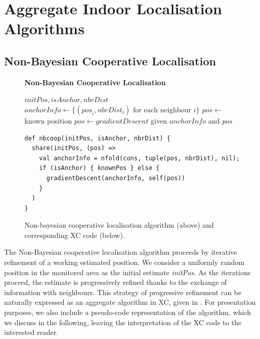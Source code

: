\documentclass[runningheads]{llncs}
\begin{document}
\section{Aggregate Indoor Localisation Algorithms} \label{sec:algorithms}

\subsection{Non-Bayesian Cooperative Localisation}

\begin{figure}[t]
\textbf{Non-Bayesian Cooperative Localisation}
\begin{algorithmic}[1]
    \Require $\mathit{initPos}, \mathit{isAnchor}, \mathit{nbrDist}$
        \State $\mathit{anchorInfo} \gets \{(\mathit{pos}_i, \mathit{nbrDist}_i) \text{ for each neighbour } i\}$
            \State \Return $\mathit{pos} \gets$ known position
        \Else
            \State \Return  $\mathit{pos} \gets \mathit{gradientDescent}$ given $\mathit{anchorInfo}$ and $\mathit{pos}$
        \EndIf
    \EndShare
\end{algorithmic}
\medskip
\begin{lstlisting}[language=xc]
def nbcoop(initPos, isAnchor, nbrDist) {
  share(initPos, (pos) =>
    val anchorInfo = nfold(cons, tuple(pos, nbrDist), nil);
    if (isAnchor) { knownPos } else {
      gradientDescent(anchorInfo, self(pos))
    }
  )
}
\end{lstlisting}
    \caption{Non-bayesian cooperative localisation algorithm (above) and corresponding XC code (below).}
    \label{code:nbcoop}
\end{figure}

The Non-Bayesian cooperative localisation algorithm \cite{DBLP:journals/pieee/WymeerschLW09} proceeds by iterative refinement of a working estimated position. We consider a uniformly random position in the monitored area as the initial estimate \emph{initPos}. As the iterations proceed, the estimate is progressively refined thanks to the exchange of information with neighbours. This strategy of progressive refinement can be naturally expressed as an aggregate algorithm in XC, given in . For presentation purposes, we also include a pseudo-code representation of the algorithm, which we discuss in the following, leaving the interpretation of the XC code to the interested reader.
\end{document}
